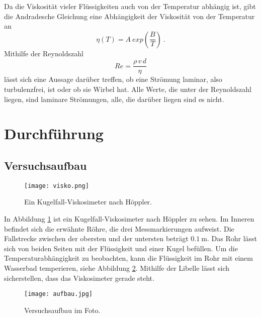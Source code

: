 Da die Viskosität vieler Flüssigkeiten auch von der Temperatur abhängig ist, gibt die
Andradesche Gleichung eine Abhängigkeit der Viskosität von der Temperatur an
\begin{equation}
  \eta(T) = A \ exp\left(\frac{B}{T}\right) \ .
  \label{eqn:5}
\end{equation}
Mithilfe der Reynoldszahl
\begin{equation}
  Re = \frac{\rho \, v \, d}{\eta}
  \label{eqn:6}
\end{equation}
lässt sich eine Aussage darüber treffen, ob eine Strömung laminar, also turbulenzfrei,
ist oder ob sie Wirbel hat. Alle Werte, die unter der Reynoldszahl liegen, sind laminare
Strömungen, alle, die darüber liegen sind es nicht.

\section{Durchführung}
\subsection{Versuchsaufbau}
\label{sec:3.1}
\begin{figure}
  \centering
  \texttt{[image: visko.png]}
  \caption{Ein Kugelfall-Viskosimeter nach Höppler.}
  \label{fig:1}
\end{figure}
In Abbildung \ref{fig:1} ist ein Kugelfall-Viskosimeter nach Höppler zu sehen.
Im Inneren befindet sich die erwähnte Röhre, die drei Messmarkierungen aufweist.
Die Fallstrecke zwischen der obersten und der untersten beträgt $\SI{0.1}{\meter}$.
Das Rohr lässt sich von beiden Seiten mit der Flüssigkeit und einer Kugel befüllen.
Um die Temperaturabhängigkeit zu beobachten, kann die Flüssigkeit im Rohr mit einem Wasserbad
temperieren, siehe Abbildung \ref{fig:2}. Mithilfe der Libelle lässt sich sicherstellen,
dass das Viskosimeter gerade steht.
\begin{figure}
  \centering
  \texttt{[image: aufbau.jpg]}
  \caption{Versuchsaufbau im Foto.}
  \label{fig:2}
\end{figure}
